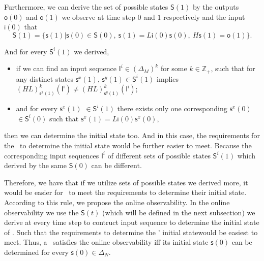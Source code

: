 Furthermore, we can derive the set of possible states $\mathsf{S}(1)$ by the outputs $\mathsf{o}(0)$ and $\mathsf{o}(1)$ we observe at time step $0$ and $1$ respectively and the input $\mathsf{i}(0)$ that
\[\mathsf{S}(1)=\{\mathsf{s}(1)|\mathsf{s}(0)\in \mathsf{S}(0),\ \mathsf{s}(1)=L{\mathsf{i}(0)}{\mathsf{s}(0)},\ H \mathsf{s}(1)=\mathsf{o}(1)\}.\]

And for every $\mathsf{S}^{i}(1)$ we derived, 
\begin{itemize}
  \item if we can find an input sequence $\mathsf{I}^{i}\in(\Delta_M)^k$ for some $k\in \mathbb{Z}_+$, such that for any distinct states $\mathsf{s}^{x}(1)$, $\mathsf{s}^{y}(1) \in \mathsf{S}^{i}(1)$ implies $(HL)^k_{\mathsf{s}^{x}(1)}(\mathsf{I^i})\neq (HL)^k_{\mathsf{s}^{y}(1)}(\mathsf{I^i})$;
  \item  and for every $\mathsf{s}^{x}(1)$ $\in \mathsf{S}^{i}(1)$ there exists only one corresponding $\mathsf{s}^{x}(0)$ $\in \mathsf{S}^{i}(0)$ such that $\mathsf{s}^{x}(1)=L{\mathsf{i}(0)}{\mathsf{s}^{x}(0)}$,
\end{itemize} 
then we can determine the initial state too. And in this case, the requirements for the \BCN\ to determine the initial state would be further easier to meet. Because the corresponding input sequences $\mathsf{I}^{i}$ of different sets of possible states $\mathsf{S}^{i}(1)$ which derived by the same $\mathsf{S}(0)$ can be different. 

Therefore, we have that if we utilize sets of possible states we derived more, it would be easier for \BCNs\ to meet the requirements to determine their initial state. According to this rule, we propose the online observability. In the online observability we use the $\mathsf{S}(t)$ (which will be defined in the next subsection) we derive at every time step to contruct input sequence to determine the initial state of \BCNs. Such that the requirements to determine the \BCNs' initial statewould be easiest to meet. Thus, a \BCN\ satisfies the online observability iff its initial state $\mathsf{s}(0)$ can be determined for every $\mathsf{s}(0) \in \Delta_N$.


